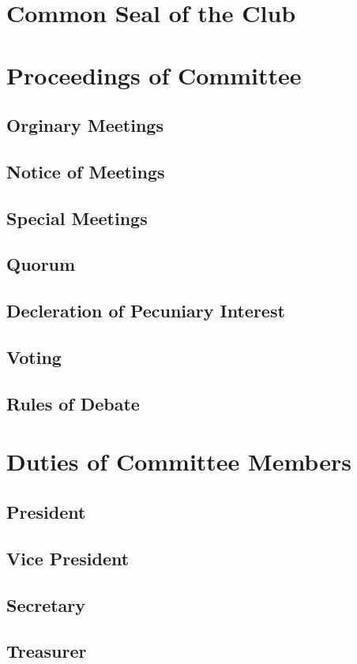 \documentclass[12pt]{article} %
\begin{document}
\section{Common Seal of the Club}
\section{Proceedings of Committee}
\subsection{Orginary Meetings}
\subsection{Notice of Meetings}
\subsection{Special Meetings}
\subsection{Quorum}
\subsection{Decleration of Pecuniary Interest}
\subsection{Voting}
\subsection{Rules of Debate}

\section{Duties of Committee Members}
\subsection{President}
\subsection{Vice President}
\subsection{Secretary}
\subsection{Treasurer}
\end{document}
